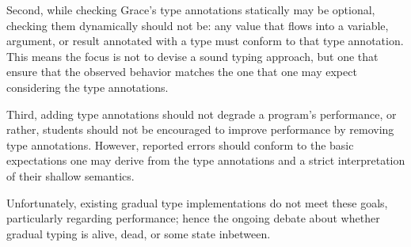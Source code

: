 Second, while checking Grace's type annotations
statically may be optional, checking them dynamically should
not be: any value that flows into a variable, argument, or result
annotated with a type must conform to that type annotation.
This means the focus is not to devise a sound typing approach,
but one that ensure that the observed behavior matches
the one that one may expect considering the type annotations.

Third, adding type
annotations should not degrade a program's performance, or rather,
students should not be encouraged to improve performance by removing
type annotations.
However, reported errors should conform to the basic expectations one
may derive from the type annotations
and a strict interpretation of their shallow semantics.

Unfortunately, existing gradual type
implementations do not meet these goals, particularly regarding
performance; hence the ongoing debate about whether gradual typing is
alive, dead, or some state
inbetween\citep{Takikawa2016,Vitousek2017,Muehlboeck2017,Bauman2017,Richards2017,Greenman2018}.






